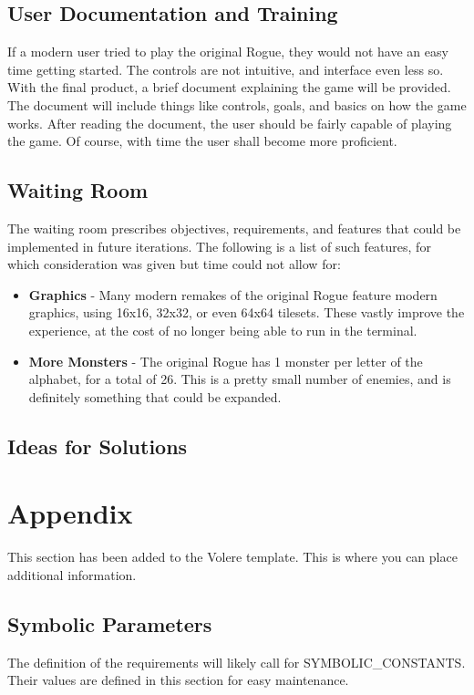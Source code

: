 \documentclass[12pt, titlepage]{article}
\begin{document}
	\subsection{User Documentation and Training}

	If a modern user tried to play the original Rogue, they would not have an easy time getting started. The controls are not intuitive, and interface even less so. With the final product, a brief document explaining the game will be provided. The document will include things like controls, goals, and basics on how the game works. After reading the document, the user should be fairly capable of playing the game. Of course, with time the user shall become more proficient.

	\subsection{Waiting Room}

	The waiting room prescribes objectives, requirements, and features that could be implemented in future iterations. The following is a list of such features, for which consideration was given but time could not allow for:
	\begin{itemize}
		\item \textbf{Graphics} - Many modern remakes of the original Rogue feature modern graphics, using 16x16, 32x32, or even 64x64 tilesets. These vastly improve the experience, at the cost of no longer being able to run in the terminal.
		\item \textbf{More Monsters} - The original Rogue has 1 monster per letter of the alphabet, for a total of 26. This is a pretty small number of enemies, and is definitely something that could be expanded.
	\end{itemize}

	\subsection{Ideas for Solutions}

\newpage





\newpage

\section{Appendix}

This section has been added to the Volere template.  This is where you can place
additional information.

	\subsection{Symbolic Parameters}

	The definition of the requirements will likely call for SYMBOLIC\_CONSTANTS.
	Their values are defined in this section for easy maintenance.
\end{document}
